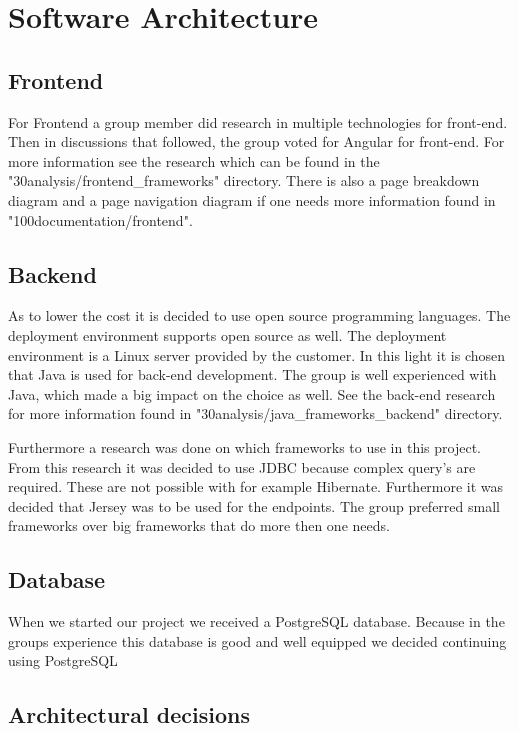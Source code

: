 
\chapter{Software Architecture}

\section{Frontend}

For Frontend a group member did research in multiple technologies for front-end. Then in discussions that followed, the group voted for Angular for front-end. For more information see the research which can be found in the "30analysis/frontend\_frameworks" directory. There is also a page breakdown diagram and a page navigation diagram if one needs more information found in "100documentation/frontend".

\section{Backend}

As to lower the cost it is decided to use open source programming languages. The deployment environment supports open source as well. The deployment environment is a Linux server provided by the customer. In this light it is chosen that Java is used for back-end development. The group is well experienced with Java, which made a big impact on the choice as well. See the back-end research for more information found in "30analysis/java\_frameworks\_backend" directory.

Furthermore a research was done on which frameworks to use in this project. From this research it was decided to use JDBC because complex query's are required. These are not possible with for example Hibernate. Furthermore it was decided that Jersey was to be used for the endpoints. The group preferred small frameworks over big frameworks that do more then one needs.

\section{Database}

When we started our project we received a PostgreSQL database. Because in the groups experience this database is good and well equipped we decided continuing using PostgreSQL


\section{Architectural decisions}

